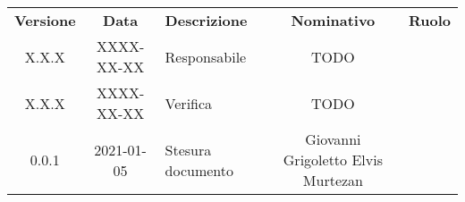 {
    \renewcommand{\arraystretch}{1.5}
    \centering
    \begin{longtable}{ c c  C{4cm}  c  c }
        \rowcolor{\primaryColor}
        \textcolor{\secondaryColor}{
        \textbf{Versione}}     & \textcolor{\secondaryColor}{\textbf{Data}}       & \textcolor{\secondaryColor}
        {\textbf{Descrizione}} & \textcolor{\secondaryColor}{\textbf{Nominativo}} & \textcolor{\secondaryColor}{\textbf{Ruolo}}                          \\


        X.X.X  & 
        XXXX-XX-XX  & 
        Responsabile & 
        TODO & 
        \responsabile{} \\

        X.X.X  & 
        XXXX-XX-XX & 
        Verifica & 
        TODO & 
        \verificatore{} \\
        
        0.0.1  & 
        2021-01-05 & 
        Stesura documento & 
        Giovanni Grigoletto \newline Elvis Murtezan  & 
        \redattore{} \\
    \end{longtable}
}